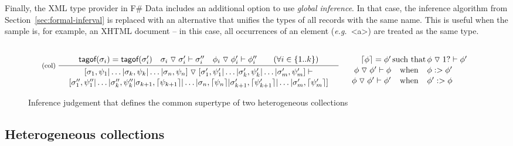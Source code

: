 \documentclass[preprint]{sigplanconf}
\newcommand{\ident}[1]{\textnormal{\sffamily #1}}
\newcommand{\narrow}[1]{\hspace{-0.85em} #1 \hspace{-0.85em}}
\newcommand{\tsep}[0]{\; \triangledown \;}
\newcommand{\addopt}[1]{\lceil#1\rceil}
\newcommand{\tytagof}{\ident{tagof}}
\begin{document}
Finally, the XML type provider in F\# Data includes an additional option to use \emph{global inference}.
In that case, the inference algorithm from Section~\ref{sec:formal-inferval} is replaced with an alternative
that unifies the types of all records with the same name. This is useful when the sample is, for example,
an XHTML document -- in this case, all occurrences of an element (\emph{e.g.}~{\small\ttfamily <a>})
are treated as the same type.


\begin{figure}
\noindent
\begin{equation*}
\inference[(col)\;]
  { \tytagof(\sigma_i) = \tytagof(\sigma'_i) \quad 
    \sigma_i \tsep \sigma'_i \vdash \sigma''_i \quad
    \phi_i \tsep \phi'_i \vdash \phi''_i \qquad (\forall i\in \{ 1 .. k \}) }
  { \begin{array}{c}
    [\sigma_1,\psi_1 | \ldots | \sigma_k,\psi_k | \ldots | \sigma_n,\psi_n ] \tsep 
    [\sigma'_1,\psi'_1 | \ldots | \sigma'_k, \psi'_k | \ldots | \sigma'_m, \psi'_m ] \vdash\\[0.1em]
    [\sigma''_1, \psi''_1 | \ldots | \sigma''_k, \psi''_k | 
        \sigma_{k+1},\addopt{\psi_{k+1}} | \ldots | \sigma_{n},\addopt{\psi_{n}} |
        \sigma'_{k+1},\addopt{\psi'_{k+1}} | \ldots | \sigma'_{m}, \addopt{\psi'_{m}} ]
    \end{array} }
\quad
\begin{array}{rcl}
 \\
 \addopt{\phi} = \phi'&\narrow{\textnormal{such that}}&\phi \tsep 1? \vdash \phi' \\[0.1em]
 \phi \tsep \phi' \vdash \phi&\narrow{\textnormal{when}}&\phi :> \phi' \\[0.1em]
 \phi \tsep \phi' \vdash \phi'&\narrow{\textnormal{when}}&\phi' :> \phi
\end{array}    
\end{equation*}
\caption{Inference judgement that defines the common supertype of two heterogeneous collections}
\label{fig:subtyping-hetcol}
\end{figure}


\subsection{Heterogeneous collections}
\label{sec:impl-collections}
\end{document}
